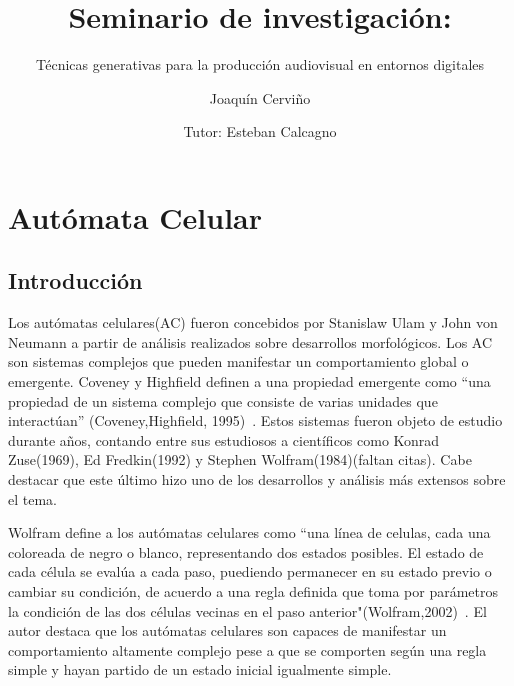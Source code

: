 \documentclass[16pt,spanish]{article}
\author{
	Joaquín Cerviño\\
	\and
	Tutor: Esteban Calcagno\\
}
\title{Seminario de investigación: }
\subtitle{Técnicas generativas para la producción audiovisual en entornos digitales}
\begin{document}
\maketitle
{}
\newpage
{}

\section{Autómata Celular}
\subsection{Introducción}

		Los autómatas celulares(AC) fueron concebidos por Stanislaw Ulam y John von
Neumann a partir de análisis realizados sobre desarrollos morfológicos. Los AC son
sistemas complejos que pueden manifestar un comportamiento global o emergente.
Coveney y Highfield definen a una propiedad emergente como “una propiedad de un
sistema complejo que consiste de varias unidades que interactúan” (Coveney,Highfield,
1995)~\cite{highfield1996frontiers}. Estos sistemas fueron objeto de estudio durante años, contando entre sus
estudiosos a científicos como Konrad Zuse(1969), Ed Fredkin(1992) y Stephen
Wolfram(1984)(faltan citas). Cabe destacar que este último hizo uno de los desarrollos y análisis más
extensos sobre el tema. 		

Wolfram define a los autómatas celulares como ``una línea de celulas, cada una coloreada de negro o blanco, representando dos estados posibles. El estado de cada célula se evalúa a cada paso, puediendo permanecer en su estado previo o cambiar su condición, de acuerdo a una regla definida que toma por parámetros la condición de las dos células vecinas en el paso anterior"(Wolfram,2002)~\cite{wolfram2002new}. El autor destaca que los autómatas celulares son capaces de manifestar un comportamiento altamente complejo pese a que se comporten según una regla simple y hayan partido de un estado inicial igualmente simple. 
\end{document}
